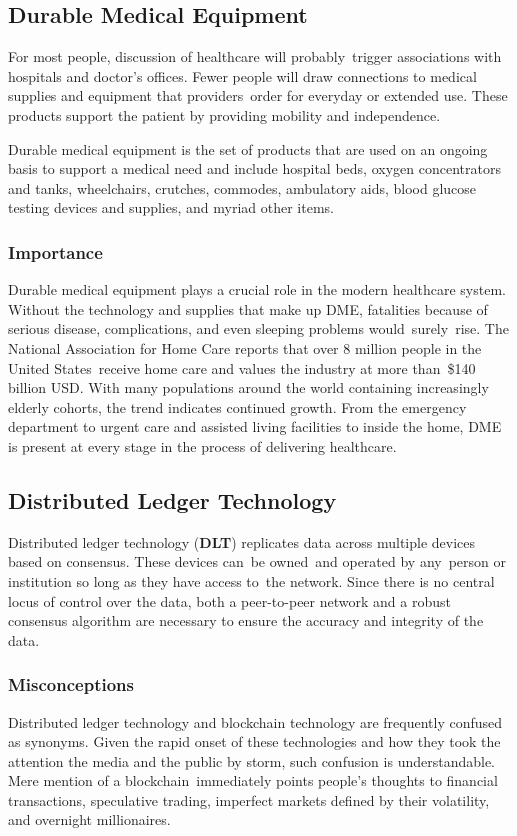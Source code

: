 \documentclass[letterpaper]{article}
\begin{document}
\subsection{Durable Medical Equipment}
For most people, discussion of healthcare will probably trigger associations with hospitals and doctor's offices. Fewer people will draw connections to medical supplies and equipment that providers order for everyday or extended use. These products support the patient by providing mobility and independence.%

Durable medical equipment is the set of products that are used on an ongoing basis to support a medical need and include hospital beds, oxygen concentrators and tanks, wheelchairs, crutches, commodes, ambulatory aids, blood glucose testing devices and supplies, and myriad other items.%

\subsubsection{Importance}
Durable medical equipment plays a crucial role in the modern healthcare system. Without the technology and supplies that make up DME, fatalities because of serious disease, complications, and even sleeping problems would surely rise. The National Association for Home Care reports that over 8 million people in the United States receive home care and values the industry at more than \$140 billion USD. With many populations around the world containing increasingly elderly cohorts, the trend indicates continued growth. From the emergency department to urgent care and assisted living facilities to inside the home, DME is present at every stage in the process of delivering healthcare.%

\subsection{Distributed Ledger Technology}
Distributed ledger technology (\textbf{DLT}) replicates data across multiple devices based on consensus. These devices can be owned and operated by any person or institution so long as they have access to the network. Since there is no central locus of control over the data, both a peer-to-peer network and a robust consensus algorithm are necessary to ensure the accuracy and integrity of the data.%

  \subsubsection{Misconceptions}
  Distributed ledger technology and blockchain technology are frequently confused as synonyms. Given the rapid onset of these technologies and how they took the attention the media and the public by storm, such confusion is understandable. Mere mention of a blockchain immediately points people's thoughts to financial transactions, speculative trading, imperfect markets defined by their volatility, and overnight millionaires.%
\end{document}
